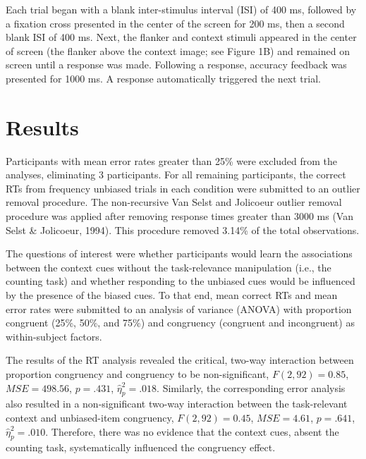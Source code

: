 \documentclass[english,,man,floatsintext]{apa6}
\begin{document}
Each trial began with a blank inter-stimulus interval (ISI) of 400 ms, followed by a fixation cross presented in the center of the screen for 200 ms, then a second blank ISI of 400 ms. Next, the flanker and context stimuli appeared in the center of screen (the flanker above the context image; see Figure 1B) and remained on screen until a response was made. Following a response, accuracy feedback was presented for 1000 ms. A response automatically triggered the next trial.

\hypertarget{results-1}{%
\section{Results}\label{results-1}}

Participants with mean error rates greater than 25\% were excluded from the analyses, eliminating 3 participants. For all remaining participants, the correct RTs from frequency unbiased trials in each condition were submitted to an outlier removal procedure. The non-recursive Van Selst and Jolicoeur outlier removal procedure was applied after removing response times greater than 3000 ms (Van Selst \& Jolicoeur, 1994). This procedure removed 3.14\% of the total observations.

The questions of interest were whether participants would learn the associations between the context cues without the task-relevance manipulation (i.e., the counting task) and whether responding to the unbiased cues would be influenced by the presence of the biased cues. To that end, mean correct RTs and mean error rates were submitted to an analysis of variance (ANOVA) with proportion congruent (25\%, 50\%, and 75\%) and congruency (congruent and incongruent) as within-subject factors.

The results of the RT analysis revealed the critical, two-way interaction between proportion congruency and congruency to be non-significant, \(F(2, 92) = 0.85\), \(\mathit{MSE} = 498.56\), \(p = .431\), \(\hat{\eta}^2_p = .018\). Similarly, the corresponding error analysis also resulted in a non-significant two-way interaction between the task-relevant context and unbiased-item congruency, \(F(2, 92) = 0.45\), \(\mathit{MSE} = 4.61\), \(p = .641\), \(\hat{\eta}^2_p = .010\). Therefore, there was no evidence that the context cues, absent the counting task, systematically influenced the congruency effect.
\end{document}
